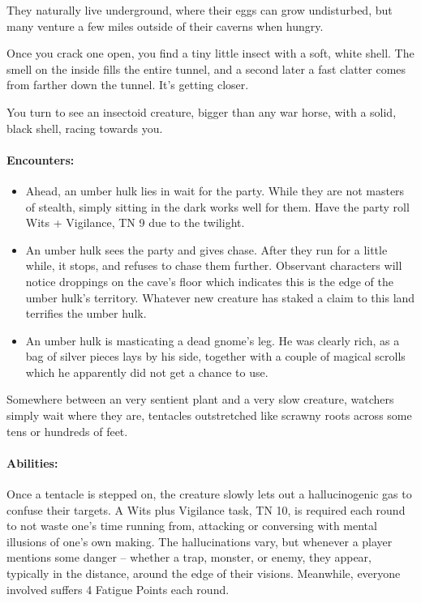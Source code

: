 \begin{multicols}{2}
They naturally live underground, where their eggs can grow undisturbed, but many venture a few miles outside of their caverns when hungry.

\begin{boxtext}

  Once you crack one open, you find a tiny little insect with a soft, white shell.
  The smell on the inside fills the entire tunnel, and a second later a fast clatter comes from farther down the tunnel.
  It's getting closer.

  You turn to see an insectoid creature, bigger than any war horse, with a solid, black shell, racing towards you.

\end{boxtext}

\paragraph{Encounters:}

\begin{itemize}

  \item
  Ahead, an umber hulk lies in wait for the party.
  While they are not masters of stealth, simply sitting in the dark works well for them.
  Have the party roll Wits + Vigilance, TN 9 due to the twilight.
  \item
  An umber hulk sees the party and gives chase.
  After they run for a little while, it stops, and refuses to chase them further.
  Observant characters will notice droppings on the cave's floor which indicates this is the edge of the umber hulk's territory.
  Whatever new creature has staked a claim to this land terrifies the umber hulk.
  \item
  An umber hulk is masticating a dead gnome's leg.
  He was clearly rich, as a bag of silver pieces lays by his side, together with a couple of magical scrolls which he apparently did not get a chance to use.

\end{itemize}

\umberhulk

\label{watcher}

Somewhere between an very sentient plant and a very slow creature, watchers simply wait where they are, tentacles outstretched like scrawny roots across some tens or hundreds of feet.


\paragraph{Abilities:} Once a tentacle is stepped on, the creature slowly lets out a hallucinogenic gas to confuse their targets.
A Wits plus Vigilance task, TN 10, is required each round to not waste one's time running from, attacking or conversing with mental illusions of one's own making.
The hallucinations vary, but whenever a player mentions some danger -- whether a trap, monster, or enemy, they appear, typically in the distance, around the edge of their visions.
Meanwhile, everyone involved suffers 4 Fatigue Points each round.


\end{multicols}
